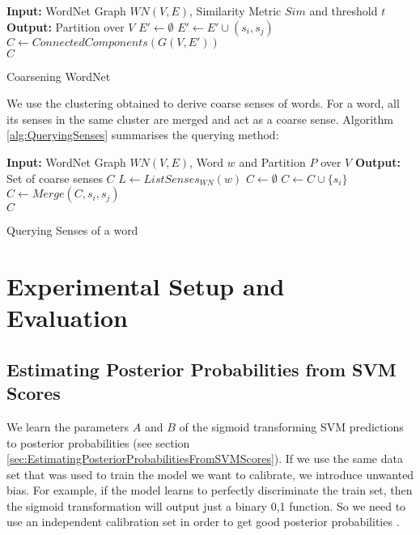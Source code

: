 \begin{algorithm}[h]
\begin{algorithmic}
 \State \textbf{Input: } WordNet Graph $WN(V,E)$, Similarity Metric $Sim$ and threshold $t$
 \State \textbf{Output: } Partition over $V$ 
 \State $E' \gets \emptyset$
    $E' \gets E' \cup (s_i,s_j)$
    \EndIf
  \EndFor
 \EndFor 
 \State $C \gets ConnectedComponents(G(V,E'))$\\
 \Return $C$
\end{algorithmic}
\caption{Coarsening WordNet}
\label{alg:CoarseningWordNet}
\end{algorithm}

We use the clustering obtained to derive coarse senses of words. For a word, all its senses in the same cluster are merged and act as a coarse sense. Algorithm \ref{alg:QueryingSenses} summarises the querying method:

\begin{algorithm}[h]
\begin{algorithmic}
 \State \textbf{Input: } WordNet Graph $WN(V,E)$, Word $w$ and Partition $P$ over $V$ 
 \State \textbf{Output: } Set of coarse senses $C$
 \State $L \gets ListSenses_{WN}(w)$
 \State $C \gets \emptyset$
  \State $C \gets C \cup \{s_i\}$
 \EndFor 
    $C \gets Merge(C,s_i,s_j)$
    \EndIf
  \EndFor
 \EndFor  \\
\Return $C$
\end{algorithmic}
\caption{Querying Senses of a word}
\label{alg:QueryingSenses}
\end{algorithm}

\section{Experimental Setup and Evaluation}
\label{section:evaluation}
\subsection{Estimating Posterior Probabilities from SVM Scores}
We learn the parameters $A$ and $B$ of the sigmoid transforming SVM predictions to posterior probabilities (see section \ref{sec:EstimatingPosteriorProbabilitiesFromSVMScores}). If we use the same data set that was used to train the model we want to calibrate, we introduce unwanted bias. For example, if the model learns to perfectly discriminate the train set, then the sigmoid transformation will output just a binary 0,1 function. So we need to use an independent calibration set in order to get good posterior probabilities \citep{Niculescu-Mizil:2005}.

